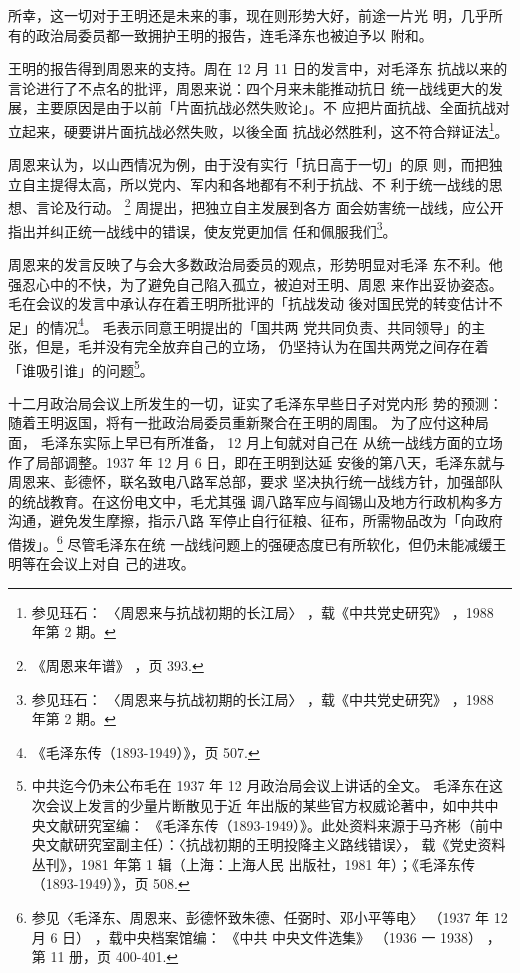 所幸，这一切对于王明还是未来的事，现在则形势大好，前途一片光
明，几乎所有的政治局委员都一致拥护王明的报告，连毛泽东也被迫予以
附和。

王明的报告得到周恩来的支持。周在 12 月 11 日的发言中，对毛泽东
抗战以来的言论进行了不点名的批评，周恩来说：四个月来未能推动抗日
统一战线更大的发展，主要原因是由于以前「片面抗战必然失败论」。不
应把片面抗战、全面抗战对立起来，硬要讲片面抗战必然失败，以後全面
抗战必然胜利，这不符合辩证法\footnote{参见珏石：
〈周恩来与抗战初期的长江局〉
，载《中共党史研究》
，1988 年第 2 期。}。

周恩来认为，以山西情况为例，由于没有实行「抗日高于一切」的原
则，而把独立自主提得太高，所以党内、军内和各地都有不利于抗战、不
利于统一战线的思想、言论及行动。
\footnote{《周恩来年谱》
，页 393.}
周提出，把独立自主发展到各方
面会妨害统一战线，应公开指出并纠正统一战线中的错误，使友党更加信
任和佩服我们\footnote{参见珏石：
〈周恩来与抗战初期的长江局〉
，载《中共党史研究》
，1988 年第 2 期。}。

周恩来的发言反映了与会大多数政治局委员的观点，形势明显对毛泽
东不利。他强忍心中的不快，为了避免自己陷入孤立，被迫对王明、周恩
来作出妥协姿态。毛在会议的发言中承认存在着王明所批评的「抗战发动
後对国民党的转变估计不足」的情况\footnote{《毛泽东传（1893-1949）》，页 507.}。 毛表示同意王明提出的「国共两
党共同负责、共同领导」的主张，但是，毛并没有完全放弃自己的立场，
仍坚持认为在国共两党之间存在着「谁吸引谁」的问题\footnote{中共迄今仍未公布毛在 1937 年 12 月政治局会议上讲话的全文。
毛泽东在这次会议上发言的少量片断散见于近
年出版的某些官方权威论著中，如中共中央文献研究室编：
《毛泽东传（1893-1949）》。此处资料来源于马齐彬（前中
央文献研究室副主任）：〈抗战初期的王明投降主义路线错误〉，
载《党史资料丛刊》，1981 年第 1 辑（上海：上海人民
出版社，1981 年）；《毛泽东传（1893-1949）》，页 508.  }。

十二月政治局会议上所发生的一切，证实了毛泽东早些日子对党内形
势的预测：随着王明返国，将有一批政治局委员重新聚合在王明的周围。
为了应付这种局面，
毛泽东实际上早已有所准备， 12 月上旬就对自己在
从统一战线方面的立场作了局部调整。1937 年 12 月 6 日，即在王明到达延
安後的第八天，毛泽东就与周恩来、彭德怀，联名致电八路军总部，要求
坚决执行统一战线方针，加强部队的统战教育。在这份电文中，毛尤其强
调八路军应与阎锡山及地方行政机构多方沟通，避免发生摩擦，指示八路
军停止自行征粮、征布，所需物品改为「向政府借拨」。\footnote{参见〈毛泽东、周恩来、彭德怀致朱德、任弼时、邓小平等电〉
（1937 年 12 月 6 日）
，载中央档案馆编：
《中共
中央文件选集》
（1936 一 1938）
，第 11 册，页 400-401.} 尽管毛泽东在统
一战线问题上的强硬态度已有所软化，但仍未能减缓王明等在会议上对自
己的进攻。

